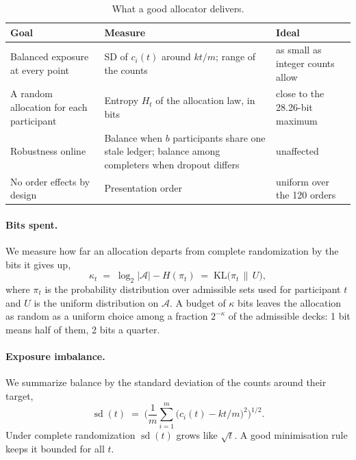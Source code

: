 \documentclass[11pt]{article}
\newcommand{\A}{\mathcal{A}}
\newcommand{\KL}{\mathrm{KL}}
\newcommand{\Unif}{U}
\begin{document}
\begin{table}[ht]
\centering\small
\caption{What a good allocator delivers.}\label{tab:goals}
\begin{tabularx}{\textwidth}{@{}lXl@{}}
\toprule
Goal & Measure & Ideal \\
\midrule
Balanced exposure at every point & SD of $c_i(t)$ around $kt/m$; range of the counts & as small as integer counts allow \\
A random allocation for each participant & Entropy $H_t$ of the allocation law, in bits & close to the 28.26-bit maximum \\
Robustness online & Balance when $b$ participants share one stale ledger; balance among completers when dropout differs & unaffected \\
No order effects by design & Presentation order & uniform over the 120 orders \\
\bottomrule
\end{tabularx}
\end{table}

\paragraph{Bits spent.} We measure how far an allocation departs from complete randomization by the bits it gives up,
\begin{equation}\label{eq:kappa}
\kappa_t \;=\; \log_2|\A| - H(\pi_t) \;=\; \KL\big(\pi_t \,\big\|\, \Unif\big),
\end{equation}
where $\pi_t$ is the probability distribution over admissible sets used for participant $t$ and $\Unif$ is the uniform distribution on $\A$. A budget of $\kappa$ bits leaves the allocation as random as a uniform choice among a fraction $2^{-\kappa}$ of the admissible decks: 1 bit means half of them, 2 bits a quarter.

\paragraph{Exposure imbalance.} We summarize balance by the standard deviation of the counts around their target,
\begin{equation}
\operatorname{sd}(t) \;=\; \Big(\frac{1}{m}\sum_{i=1}^{m}\big(c_i(t) - kt/m\big)^{2}\Big)^{1/2}.
\end{equation}
Under complete randomization $\operatorname{sd}(t)$ grows like $\sqrt{t}$. A good minimisation rule keeps it bounded for all $t$.

\end{document}
